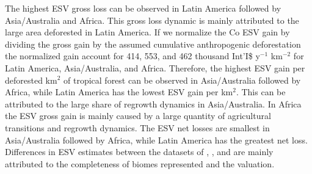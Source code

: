 		The highest \ac{ESV} gross loss can be observed in Latin America followed by Asia/Australia and Africa. This gross loss dynamic is mainly attributed to the large area deforested in Latin America. If we normalize the Co \ac{ESV} gain by dividing the gross gain by the assumed cumulative anthropogenic deforestation the normalized gain account for 414, 553, and 462 thousand Int'I\$ y$^{-1}$ km$^{-2}$ for Latin America, Asia/Australia, and Africa. Therefore, the highest \ac{ESV} gain per deforested km$^2$ of tropical forest can be observed in Asia/Australia followed by Africa, while Latin America has the lowest \ac{ESV} gain per km$^2$. This can be attributed to the large share of regrowth dynamics in Asia/Australia. In Africa the \ac{ESV} gross gain is mainly caused by a large quantity of agricultural transitions and regrowth dynamics. The \ac{ESV} net losses are smallest in Asia/Australia followed by Africa, while Latin America has the greatest net loss. Differences in \ac{ESV} estimates between the datasets of \citet{Costanza2014}, \citet{Groot2012}, and \citet{Siikamaki2015} are mainly attributed to the completeness of biomes represented and the valuation.